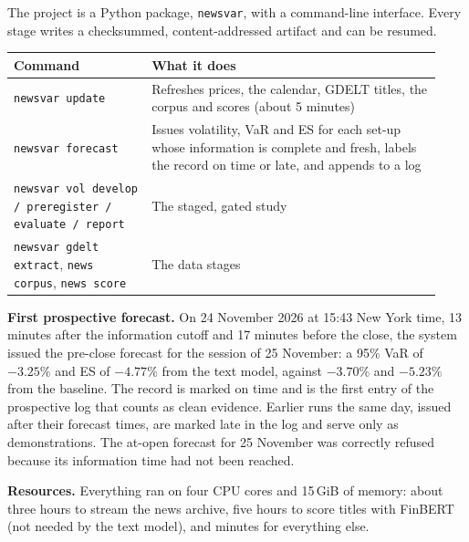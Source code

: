 \documentclass[11pt,a4paper]{article}
\begin{document}
The project is a Python package, \texttt{newsvar}, with a command-line interface. Every stage
writes a checksummed, content-addressed artifact and can be resumed.

\begin{center}
\begin{tabular}{@{}p{0.30\linewidth}p{0.63\linewidth}@{}}
\toprule
\textbf{Command} & \textbf{What it does} \\
\midrule
\texttt{newsvar update} & Refreshes prices, the calendar, GDELT titles, the corpus and scores (about 5 minutes) \\
\texttt{newsvar forecast} & Issues volatility, VaR and ES for each set-up whose information is complete and fresh, labels the record on time or late, and appends to a log \\
\texttt{newsvar vol develop / preregister / evaluate / report} & The staged, gated study \\
\texttt{newsvar gdelt extract}, \texttt{news corpus}, \texttt{news score} & The data stages \\
\bottomrule
\end{tabular}
\end{center}

\textbf{First prospective forecast.} On 24 November 2026 at 15:43 New York time, 13 minutes
after the information cutoff and 17 minutes before the close, the system issued the pre-close
forecast for the session of 25 November: a 95\% VaR of $-3.25\%$ and ES of $-4.77\%$ from the
text model, against $-3.70\%$ and $-5.23\%$ from the baseline. The record is marked on time
and is the first entry of the prospective log that counts as clean evidence. Earlier runs the
same day, issued after their forecast times, are marked late in the log and serve only as
demonstrations. The at-open forecast for 25 November was correctly refused because its
information time had not been reached.

\textbf{Resources.} Everything ran on four CPU cores and 15\,GiB of memory: about three hours to
stream the news archive, five hours to score titles with FinBERT (not needed by the text
model), and minutes for everything else.
\end{document}

